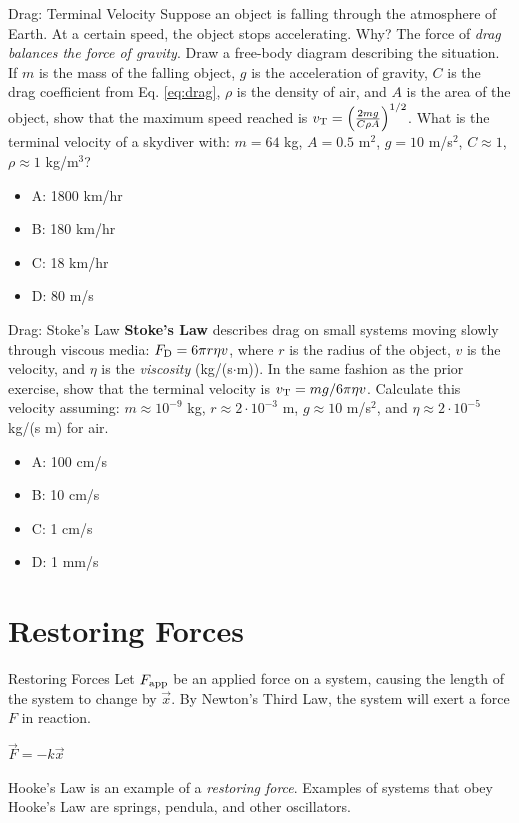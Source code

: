 \documentclass{beamer}
\begin{document}
\begin{frame}{Drag: Terminal Velocity}
\small
Suppose an object is falling through the atmosphere of Earth.  At a certain speed, the object stops accelerating.  Why?  The force of \textit{drag balances the force of gravity}.  Draw a free-body diagram describing the situation.  If $m$ is the mass of the falling object, $g$ is the acceleration of gravity, $C$ is the drag coefficient from Eq. \ref{eq:drag}, $\rho$ is the density of air, and $A$ is the area of the object, show that the maximum speed reached is $v_{\rm T} = \left(\frac{2mg}{C\rho A}\right)^{1/2}$.  What is the terminal velocity of a skydiver with: $m = 64$ kg, $A = 0.5$ m$^2$, $g = 10$ m/s$^2$, $C \approx 1$, $\rho \approx 1$ kg/m$^3$?
\begin{itemize}
\item A: 1800 km/hr
\item B: 180 km/hr
\item C: 18 km/hr
\item D: 80 m/s
\end{itemize}
\end{frame}

\begin{frame}{Drag: Stoke's Law}
\small
\alert{\textbf{Stoke's Law}} describes drag on small systems moving slowly through viscous media: $F_{\rm D} = 6\pi r\eta v$, where $r$ is the radius of the object, $v$ is the velocity, and $\eta$ is the \textit{viscosity} (kg/(s$\cdot$m)).  In the same fashion as the prior exercise, show that the terminal velocity is $v_{\rm T} = mg/6\pi\eta v$.  Calculate this velocity assuming: $m\approx 10^{-9}$ kg, $r\approx 2 \cdot 10^{-3}$ m, $g\approx 10$ m/s$^2$, and $\eta \approx 2 \cdot 10^{-5}$ kg/(s m) for air.
\begin{itemize}
\item A: 100 cm/s
\item B: 10 cm/s
\item C: 1 cm/s
\item D: 1 mm/s
\end{itemize}
\end{frame}

\section{Restoring Forces}

\begin{frame}{Restoring Forces}
Let $F_{\rm app}$ be an applied force on a system, causing the length of the system to change by $\vec{x}$.  By Newton's Third Law, the system will exert a force $F$ in reaction. \\
\vspace{1cm}
\begin{tcolorbox}[colback=white,colframe=red!40!blue,title=Hooke's Law]
\alert{$\vec{F} = -k\vec{x}$}
\end{tcolorbox}
\vspace{0.5cm}
Hooke's Law is an example of a \textit{restoring force}.  Examples of systems that obey Hooke's Law are springs, pendula, and other oscillators.
\end{frame}
\end{document}
